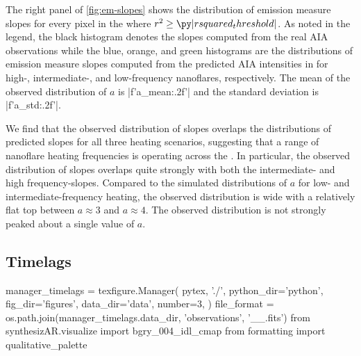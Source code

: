 The right panel of \autoref{fig:em-slopes} shows the distribution of emission measure slopes for every pixel in the \AR{} where $r^2\ge\py|rsquared_threshold|$. As noted in the legend, the black histogram denotes the slopes computed from the real AIA observations while the blue, orange, and green histograms are the distributions of emission measure slopes computed from the predicted AIA intensities in  for high-, intermediate-, and low-frequency nanoflares, respectively. The mean of the observed distribution of $a$ is \py[manager_em]|f'{a_mean:.2f}'| and the standard deviation is \py[manager_em]|f'{a_std:.2f}'|. 

We find that the observed distribution of slopes overlaps the distributions of predicted slopes for all three heating scenarios, suggesting that a range of nanoflare heating frequencies is operating across the \AR. In particular, the observed distribution of slopes overlaps quite strongly with both the intermediate- and high frequency-slopes. Compared to the simulated distributions of $a$ for low- and intermediate-frequency heating, the observed distribution is wide with a relatively flat top between $a\approx3$ and $a\approx4$. The observed distribution is not strongly peaked about a single value of $a$. 

\subsection{Timelags}\label{sec:timelags}

\begin{pycode}
manager_timelags = texfigure.Manager(
    pytex, './',
    python_dir='python',
    fig_dir='figures',
    data_dir='data',
    number=3,
)
file_format = os.path.join(manager_timelags.data_dir, 'observations', '{}_{}_{}.fits')
from synthesizAR.visualize import bgry_004_idl_cmap
from formatting import qualitative_palette
\end{pycode}


